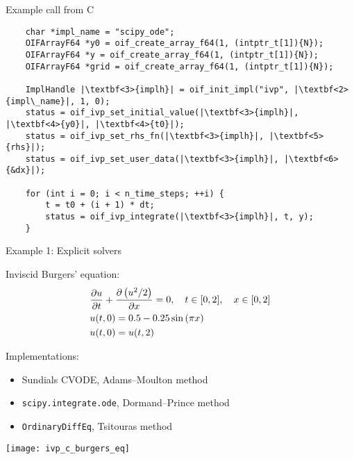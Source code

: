 \documentclass[10pt, aspectratio=169, progressbar=frametitle]{beamer}
\begin{document}
\begin{frame}[fragile]{Example call from C}
  \begin{verbatim}
    char *impl_name = "scipy_ode";
    OIFArrayF64 *y0 = oif_create_array_f64(1, (intptr_t[1]){N});
    OIFArrayF64 *y = oif_create_array_f64(1, (intptr_t[1]){N});
    OIFArrayF64 *grid = oif_create_array_f64(1, (intptr_t[1]){N});

    ImplHandle |\textbf<3>{implh}| = oif_init_impl("ivp", |\textbf<2>{impl\_name}|, 1, 0);
    status = oif_ivp_set_initial_value(|\textbf<3>{implh}|, |\textbf<4>{y0}|, |\textbf<4>{t0}|);
    status = oif_ivp_set_rhs_fn(|\textbf<3>{implh}|, |\textbf<5>{rhs}|);
    status = oif_ivp_set_user_data(|\textbf<3>{implh}|, |\textbf<6>{&dx}|);

    for (int i = 0; i < n_time_steps; ++i) {
        t = t0 + (i + 1) * dt;
        status = oif_ivp_integrate(|\textbf<3>{implh}|, t, y);
    }
  \end{verbatim}
\end{frame}

\begin{frame}{Example 1: Explicit solvers}
  \begin{minipage}{\dimexpr0.6\textwidth - 2\tabcolsep}
  Inviscid Burgers' equation:
    \begin{align*}
      &\pdv{u}{t} + \pdv{\left( u^{2} / 2 \right)}{x} = 0,
      \quad t \in [0, 2], \quad x \in [0, 2] \\
      &u(t, 0) = 0.5 - 0.25 \sin \left( \pi x \right)\\
      &u(t, 0) = u(t, 2)
    \end{align*}

    Implementations:
    \begin{itemize}
      \item Sundials CVODE, Adams--Moulton method
      \item \texttt{scipy.integrate.ode}, Dormand--Prince method
      \item \texttt{OrdinaryDiffEq}, Tsitouras method
    \end{itemize}
  \end{minipage}\hfill
  \begin{minipage}{\dimexpr0.4\textwidth - 2\tabcolsep}
    \texttt{[image: ivp\_c\_burgers\_eq]}
  \end{minipage}
\end{frame}
\end{document}
